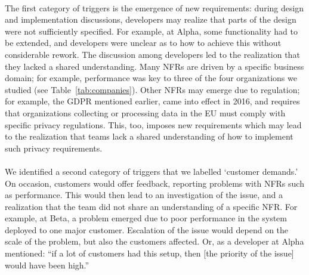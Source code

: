 \documentclass[smallextended]{svjour3}        %
\providecommand{\DIFaddtex}[1]{{\protect\color{blue}\uwave{#1}}} %
\providecommand{\DIFaddbegin}{} %
\providecommand{\DIFaddend}{} %
\providecommand{\DIFadd}[1]{\texorpdfstring{\DIFaddtex{#1}}{#1}} %
\newcommand{\DIFaddincludegraphics}[2][]{{\color{blue}\fbox{\DIFOincludegraphics[#1]{#2}}}} %
\DeclareRobustCommand{\DIFaddbegin}{\DIFOaddbegin \let\includegraphics\DIFaddincludegraphics} %
\DeclareRobustCommand{\DIFaddend}{\DIFOaddend \let\includegraphics\DIFOincludegraphics} %
\begin{document}
\DIFaddbegin \paragraph{\DIFadd{New requirements}} \DIFaddend The first category of triggers is the emergence of new requirements: during design and implementation discussions, developers may realize that parts of the design were not sufficiently specified. For example, at Alpha, some functionality had to be extended, and developers were unclear as to how to achieve this without considerable rework. The discussion among developers led to the realization that they lacked a shared understanding.
Many NFRs are driven by a specific business domain; for example, performance was key to three of the four organizations we studied (see Table~\ref{tab:companies}). Other NFRs may emerge due to regulation; for example, the 
GDPR mentioned earlier, came into effect in 2016, and requires that organizations collecting or processing data in the EU must comply with specific privacy regulations. This, too, imposes new requirements which may lead to the realization that teams lack a shared understanding of how to implement such privacy requirements.

\DIFaddbegin \paragraph{\DIFadd{Customer demands}} \DIFaddend We identified a second category of triggers that we labelled `customer demands.' On occasion, customers would offer feedback, reporting problems with NFRs such as performance. This would then lead to an investigation of the issue, and a realization that the team did not share an understanding of a specific NFR.  For example, at Beta, a problem emerged due to poor performance in the system deployed to one major customer. Escalation of the issue would depend on the scale of the problem, but also the customers affected. Or, as a developer at Alpha mentioned: \textmd{``if a lot of customers had this setup, then [the priority of the issue] would have been high.''}
\end{document}
